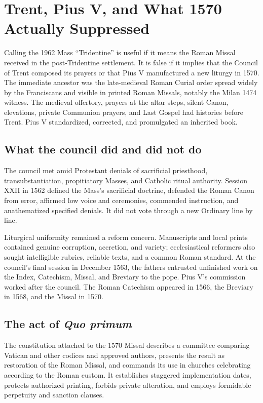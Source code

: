 \section{Trent, Pius V, and What 1570 Actually Suppressed}

Calling the 1962 Mass “Tridentine” is useful if it means the Roman Missal received in the post-Tridentine settlement. It is false if it implies that the Council of Trent composed its prayers or that Pius V manufactured a new liturgy in 1570. The immediate ancestor was the late-medieval Roman Curial order spread widely by the Franciscans and visible in printed Roman Missals, notably the Milan 1474 witness. The medieval offertory, prayers at the altar steps, silent Canon, elevations, private Communion prayers, and Last Gospel had histories before Trent. Pius V standardized, corrected, and promulgated an inherited book.

\subsection{What the council did and did not do}

The council met amid Protestant denials of sacrificial priesthood, transubstantiation, propitiatory Masses, and Catholic ritual authority. Session XXII in 1562 defined the Mass's sacrificial doctrine, defended the Roman Canon from error, affirmed low voice and ceremonies, commended instruction, and anathematized specified denials. It did not vote through a new Ordinary line by line.

Liturgical uniformity remained a reform concern. Manuscripts and local prints contained genuine corruption, accretion, and variety; ecclesiastical reformers also sought intelligible rubrics, reliable texts, and a common Roman standard. At the council's final session in December 1563, the fathers entrusted unfinished work on the Index, Catechism, Missal, and Breviary to the pope. Pius V's commission worked after the council. The Roman Catechism appeared in 1566, the Breviary in 1568, and the Missal in 1570.

\subsection{The act of \emph{Quo primum}}

The constitution attached to the 1570 Missal describes a committee comparing Vatican and other codices and approved authors, presents the result as restoration of the Roman Missal, and commands its use in churches celebrating according to the Roman custom. It establishes staggered implementation dates, protects authorized printing, forbids private alteration, and employs formidable perpetuity and sanction clauses.


